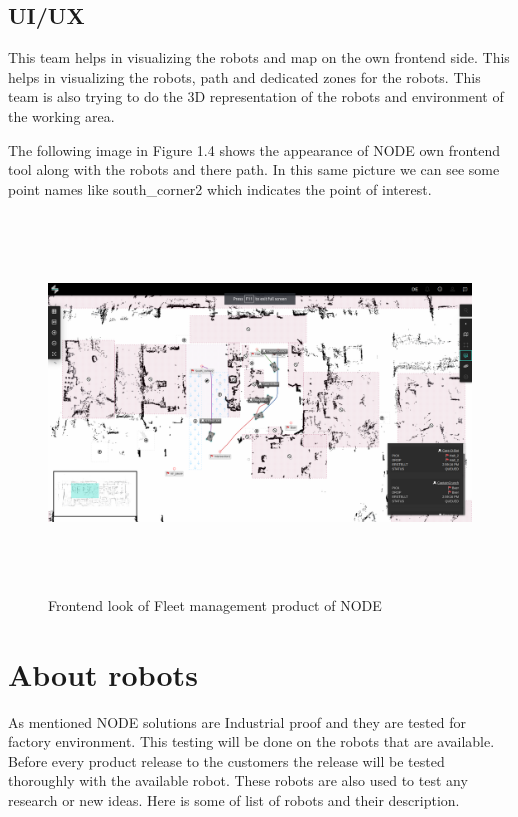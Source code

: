\subsection{UI/UX}
This team helps in visualizing the robots and map on the own frontend side. This helps in visualizing the robots, path and dedicated zones for the robots. This team is also trying to do the 3D representation of the robots and environment of the working area.

The following image in Figure 1.4 shows the appearance of NODE own frontend tool along with the robots and there path. In this same picture we can see some point names like south\_corner2 which indicates the point of interest. 

\begin{figure}[h]
	\begin{center}
		\includegraphics[height=10cm,width=\linewidth]{images/ui_ux.png}
		\caption{Frontend look of Fleet management product of NODE}
	\end{center}
\end{figure}

\section{About robots}
As mentioned NODE solutions are Industrial proof and they are tested for factory environment. This testing will be done on the robots that are available. Before every product release to the customers the release will be tested thoroughly with the available robot. These robots are also used to test any research or new ideas. Here is some of list of robots and their description.

